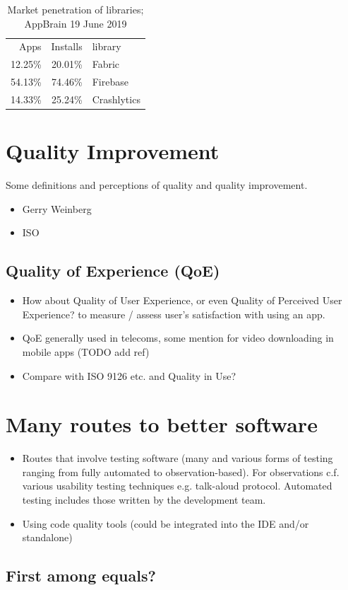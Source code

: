 \begin{table}[]
    \centering
    \begin{tabular}{r|r|l}
    Apps &Installs &library \\
    12.25\% &20.01\%  & Fabric \\
    54.13\% &74.46\%  & Firebase\\
    14.33\% &25.24\%  & Crashlytics
    \end{tabular}
    \caption{Market penetration of libraries; AppBrain 19 June 2019}
    \label{tab:appbrain_libraries_installed}
\end{table}

\section{Quality Improvement}
Some definitions and perceptions of quality and quality improvement.
\begin{itemize}
    \item Gerry Weinberg
    \item ISO
\end{itemize}

\subsection{Quality of Experience (QoE)}
\begin{itemize}
    \item How about Quality of User Experience, or even Quality of Perceived User Experience? to measure / assess user's satisfaction with using an app.
    \item QoE generally used in telecoms, some mention for video downloading in mobile apps (TODO add ref)
    \item Compare with ISO 9126 etc. and Quality in Use?
\end{itemize}

\section{Many routes to better software}

\begin{itemize}
    \item Routes that involve testing software (many and various forms of testing ranging from fully automated to observation-based). For observations c.f. various usability testing techniques e.g. talk-aloud protocol. Automated testing includes those written by the development team.
    \item Using code quality tools (could be integrated into the IDE and/or standalone)
\end{itemize}
\subsection{First among equals?}